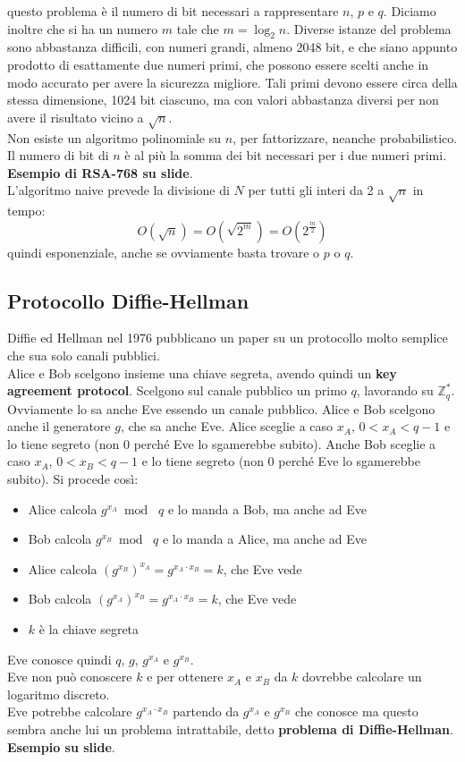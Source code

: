 \documentclass[a4paper,12pt, oneside]{book}
\begin{document}
questo problema è il numero di bit necessari a rappresentare $n$, $p$ e
$q$. Diciamo inoltre che si ha un numero $m$ tale che $m=\log_2n$. Diverse
istanze del problema sono abbastanza difficili, con numeri grandi, almeno 2048
bit, e che siano appunto prodotto di esattamente due numeri primi, che possono
essere scelti anche in modo accurato per avere la sicurezza migliore. Tali primi
devono essere circa della stessa dimensione, 1024 bit ciascuno, ma con valori
abbastanza diversi per non avere il risultato vicino a $\sqrt{n}$. \\
Non esiste un algoritmo polinomiale su $n$, per fattorizzare, neanche
probabilistico. Il numero di bit di $n$ è al più la somma dei bit necessari per
i due numeri primi.\\
\textbf{Esempio di RSA-768 su slide}.\\
L'algoritmo naive prevede la divisione di $N$ per tutti gli interi da 2 a
$\sqrt{n}$ in tempo:
\[O(\sqrt{n})=O(\sqrt{2^m})=O(2^{\frac{m}{2}})\]
quindi esponenziale, anche se ovviamente basta trovare o $p$ o $q$.\\
\subsection{Protocollo Diffie-Hellman}
Diffie ed Hellman nel 1976 pubblicano un paper su un protocollo molto semplice
che sua solo canali pubblici.\\
Alice e Bob scelgono insieme una chiave segreta, avendo quindi un \textbf{key
  agreement protocol}. Scelgono sul canale pubblico un primo $q$, lavorando su
$\mathbb{Z}_q^*$. Ovviamente lo sa anche Eve essendo un canale pubblico. Alice e
Bob scelgono anche il generatore $g$, che sa anche Eve. Alice sceglie a caso
$x_A$, $0<x_A<q-1$ e lo tiene segreto (non 0 perché Eve lo sgamerebbe
subito). Anche Bob sceglie a caso $x_A$, $0<x_B<q-1$ e lo tiene segreto (non 0
perché Eve lo sgamerebbe subito). Si procede così:
\begin{itemize}
  \item Alice calcola $g^{x_A}\bmod\,\,q$ e lo manda a Bob, ma anche ad Eve
  \item Bob calcola $g^{x_B}\bmod\,\,q$ e lo manda a Alice, ma anche ad Eve
  \item Alice calcola $(g^{x_B})^{x_A}=g^{x_A\cdot x_B}=k$, che Eve vede
  \item Bob calcola $(g^{x_A})^{x_B}=g^{x_A\cdot x_B}=k$, che Eve vede
  \item $k$ è la chiave segreta
\end{itemize}
Eve conosce quindi $q$, $g$, $g^{x_A}$ e $g^{x_B}$.\\
Eve non può conoscere $k$ e per ottenere $x_A$ e $x_B$ da $k$ dovrebbe calcolare
un logaritmo discreto.\\
Eve potrebbe calcolare $g^{x_A\cdot x_B}$ partendo da $g^{x_A}$ e $g^{x_B}$ che
conosce ma questo sembra anche lui un problema intrattabile, detto
\textbf{problema di Diffie-Hellman}.\\
\textbf{Esempio su slide}.
\end{document}
